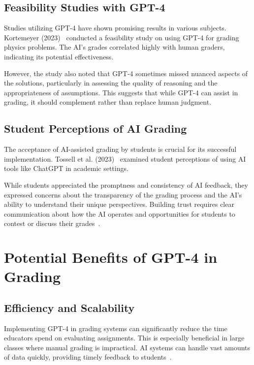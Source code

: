 \documentclass[ms,twoside,print]{nuthesis}
\begin{document}
\subsection{Feasibility Studies with GPT-4}

Studies utilizing GPT-4 have shown promising results in various subjects. Kortemeyer (2023)~\cite{Kortemeyer2023} conducted a feasibility study on using GPT-4 for grading physics problems. The AI's grades correlated highly with human graders, indicating its potential effectiveness.

However, the study also noted that GPT-4 sometimes missed nuanced aspects of the solutions, particularly in assessing the quality of reasoning and the appropriateness of assumptions. This suggests that while GPT-4 can assist in grading, it should complement rather than replace human judgment.

\subsection{Student Perceptions of AI Grading}

The acceptance of AI-assisted grading by students is crucial for its successful implementation. Tossell et al. (2023)~\cite{Tossell2023} examined student perceptions of using AI tools like ChatGPT in academic settings.

While students appreciated the promptness and consistency of AI feedback, they expressed concerns about the transparency of the grading process and the AI's ability to understand their unique perspectives. Building trust requires clear communication about how the AI operates and opportunities for students to contest or discuss their grades~\cite{Zawacki2021}.

\section{Potential Benefits of GPT-4 in Grading}

\subsection{Efficiency and Scalability}

Implementing GPT-4 in grading systems can significantly reduce the time educators spend on evaluating assignments. This is especially beneficial in large classes where manual grading is impractical. AI systems can handle vast amounts of data quickly, providing timely feedback to students~\cite{Alto2023}.
\end{document}

